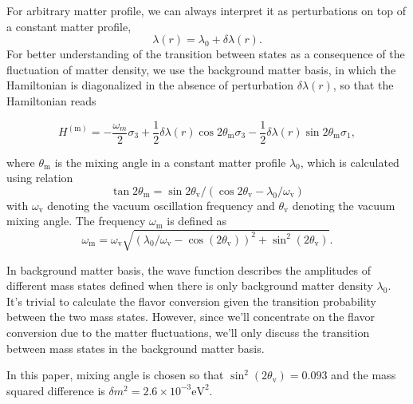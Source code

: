 \documentclass[%
reprint,
 amsmath,amssymb,
 prd,
]{revtex4-1}
\begin{document}
For arbitrary matter profile, we can always interpret it as perturbations on top of a constant matter profile,
\begin{equation}
    \lambda(r) = \lambda_0 + \delta \lambda(r).
    \label{eq-general-matter-profile}
\end{equation}
For better understanding of the transition between states as a consequence of the fluctuation of matter density, we use the background matter basis, in which the Hamiltonian is diagonalized in the absence of perturbation $\delta\lambda(r)$, so that the Hamiltonian reads
\begin{widetext}
\begin{equation}
    H^{(\mathrm{m})} = -\frac{\omega_m}{2} \sigma_3 + \frac{1}{2} \delta\lambda(r) \cos 2\theta_{\mathrm m} \sigma_3 
     - \frac{1}{2} \delta\lambda(r) \sin 2\theta_{\mathrm m} \sigma_1,
    \label{eq-hamiltonian-bg-matter-basis-general}
\end{equation}
\end{widetext}
where $\theta_{\mathrm m}$ is the mixing angle in a constant matter profile $\lambda_0$, which is calculated using relation
\begin{equation*}
\tan 2\theta_{\mathrm{m}}=\sin 2\theta_{\mathrm v}/\left( \cos 2\theta_{\mathrm v} - \lambda_0/\omega_{\mathrm v} \right)
\end{equation*}
with $\omega_{\mathrm v}$ denoting the vacuum oscillation frequency and $\theta_{\mathrm v}$ denoting the vacuum mixing angle. The frequency $\omega_{\mathrm m}$ is defined as
\begin{equation}
\omega_{\mathrm{m}} = \omega_{\mathrm{v}} \sqrt{ ( \lambda_0/\omega_{\mathrm{v}} - \cos (2\theta_{\mathrm{v}}) )^2 + \sin^2(2\theta_{\mathrm{v}}) }.
\end{equation}

In background matter basis, the wave function describes the amplitudes of different mass states defined when there is only background matter density $\lambda_0$. It's trivial to calculate the flavor conversion given the transition probability between the two mass states. However, since we'll concentrate on the flavor conversion due to the matter fluctuations, we'll only discuss the transition between mass states in the background matter basis.

In this paper, mixing angle is chosen so that $\sin^2(2\theta_{\mathrm v}) = 0.093$ and the mass squared difference is $\delta m^2 = 2.6\times 10^{-3}\mathrm{eV}^2$.
\end{document}
